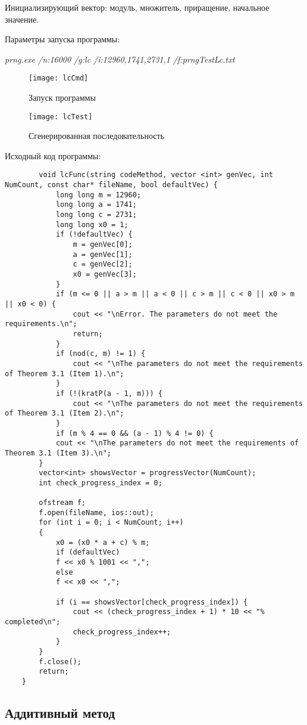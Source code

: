 \documentclass[bachelor, och, coursework]{shiza}
\begin{document}
	Инициализирующий вектор: модуль, множитель, приращение, начальное значение.
	
	Параметры запуска программы:
	
	\textit{prng.exe /n:16000 /g:lc /i:12960,1741,2731,1 /f:prngTestLc.txt}

	\begin{figure}[H]
	\centering
	\texttt{[image: lcCmd]}
	\caption{Запуск программы}
	\label{fig:lcCmd}
	\end{figure}

	\begin{figure}[H]
	\centering
	\texttt{[image: lcTest]}
	\caption{Сгенерированная последовательность}
	\label{fig:lcTest}
	\end{figure}

	Исходный код программы:
	
	\begin{verbatim}
		void lcFunc(string codeMethod, vector <int> genVec, int NumCount, const char* fileName, bool defaultVec) {
			long long m = 12960;
			long long a = 1741;
			long long c = 2731;
			long long x0 = 1;
			if (!defaultVec) {
				m = genVec[0];
				a = genVec[1];
				c = genVec[2];
				x0 = genVec[3];
			}
			if (m <= 0 || a > m || a < 0 || c > m || c < 0 || x0 > m || x0 < 0) {
				cout << "\nError. The parameters do not meet the requirements.\n";
				return;
			}
			if (nod(c, m) != 1) {
				cout << "\nThe parameters do not meet the requirements of Theorem 3.1 (Item 1).\n";
			}
			if (!(kratP(a - 1, m))) {
				cout << "\nThe parameters do not meet the requirements of Theorem 3.1 (Item 2).\n";
			}
			if (m % 4 == 0 && (a - 1) % 4 != 0) {
			cout << "\nThe parameters do not meet the requirements of Theorem 3.1 (Item 3).\n";
		}
		vector<int> showsVector = progressVector(NumCount);
		int check_progress_index = 0;
		
		ofstream f;
		f.open(fileName, ios::out);
		for (int i = 0; i < NumCount; i++)
		{
			x0 = (x0 * a + c) % m;
			if (defaultVec)
			f << x0 % 1001 << ",";
			else
			f << x0 << ",";
			
			if (i == showsVector[check_progress_index]) {
				cout << (check_progress_index + 1) * 10 << "% completed\n";
				check_progress_index++;
			}
		}
		f.close();
		return;
	}
	\end{verbatim}
	
	\subsection{Аддитивный метод}
	
\end{document}
